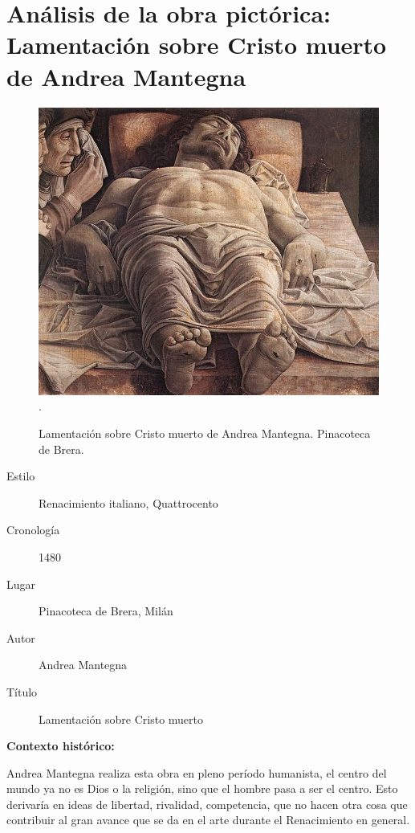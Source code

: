\section{Análisis de la obra pictórica: Lamentación sobre Cristo muerto de Andrea Mantegna}

\begin{figure}[ht!]
	\includegraphics[width=\textwidth]{mantegna.jpg}
   .\caption{Lamentación sobre Cristo muerto de Andrea Mantegna. Pinacoteca de Brera.} %
\end{figure}

\newpage

\begin{description}
\item[Estilo] Renacimiento italiano, Quattrocento
\item[Cronología] 1480
\item[Lugar] Pinacoteca de Brera, Milán
\item[Autor] Andrea Mantegna
\item[Título] Lamentación sobre Cristo muerto
\end{description}

\textbf{Contexto histórico:}

Andrea Mantegna realiza esta obra en pleno período humanista, el centro del mundo ya no es Dios o la religión, sino que el hombre pasa a ser el centro. Esto derivaría en ideas de libertad, rivalidad, competencia, que no hacen otra cosa que contribuir al gran avance que se da en el arte durante el Renacimiento en general.


